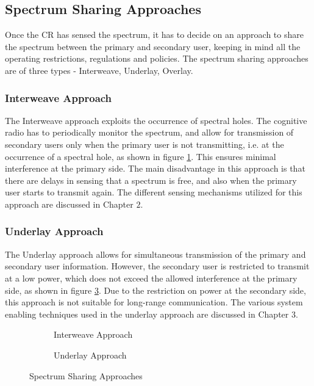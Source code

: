 \subsection{Spectrum Sharing Approaches}
Once the CR has sensed the spectrum, it has to decide on an approach to share
the spectrum between the primary and secondary user, keeping in mind all the
operating restrictions, regulations and policies. The spectrum sharing
approaches are of three types - Interweave, Underlay, Overlay.

\subsubsection{Interweave Approach}
The Interweave approach exploits the occurrence of spectral holes. The cognitive
radio has to periodically monitor the spectrum, and allow for transmission of
secondary users only when the primary user is not transmitting, i.e. at the
occurrence of a spectral hole, as shown in figure \ref{fig:interweave}. This ensures minimal
interference at the primary side. The main disadvantage in this approach is that there are delays in sensing
that a spectrum is free, and also when the primary user starts to transmit
again. The different sensing mechanisms utilized for this approach are discussed
in Chapter $2$.

\subsubsection{Underlay Approach}
The Underlay approach allows for simultaneous transmission of the primary and
secondary user information. However, the secondary user is restricted to
transmit at a low power, which does not exceed the allowed interference at the
primary side, as shown in figure \ref{fig:underlay}. Due to the
restriction on power at the secondary side, this approach is not suitable for long-range communication. The various system
enabling techniques used in the underlay approach are discussed in Chapter $3$.

\begin{figure}[h]
	\centering
	\begin{subfigure}{0.48\textwidth}
		
		\caption{Interweave Approach}
		\label{fig:interweave}
	\end{subfigure}
	\hfill
	\begin{subfigure}{0.48\textwidth}
		
		\caption{Underlay Approach}
		\label{fig:underlay}
	\end{subfigure}
	\caption{Spectrum Sharing Approaches}
\end{figure}

